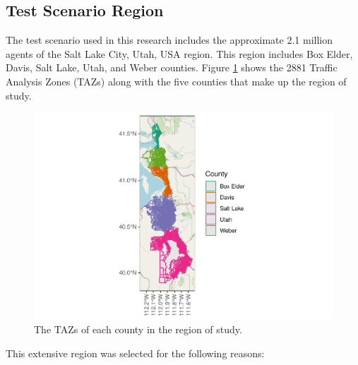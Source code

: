 \documentclass[12pt, oneside, openright]{byuthesis}
\begin{document}
\hypertarget{test-scenario-region}{%
\subsection{Test Scenario Region}\label{test-scenario-region}}

The test scenario used in this research includes the approximate 2.1 million agents of the Salt Lake City, Utah, USA region. This region includes Box Elder, Davis, Salt Lake, Utah, and Weber counties. Figure \ref{fig:figregion} shows the 2881 Traffic Analysis Zones (TAZs) along with the five counties that make up the region of study.

\begin{figure}

{\centering \includegraphics[width=480px]{thesis_files/figure-latex/figregion-1} 

}

\caption{The TAZs of each county in the region of study.}\label{fig:figregion}
\end{figure}

This extensive region was selected for the following reasons:
\end{document}
